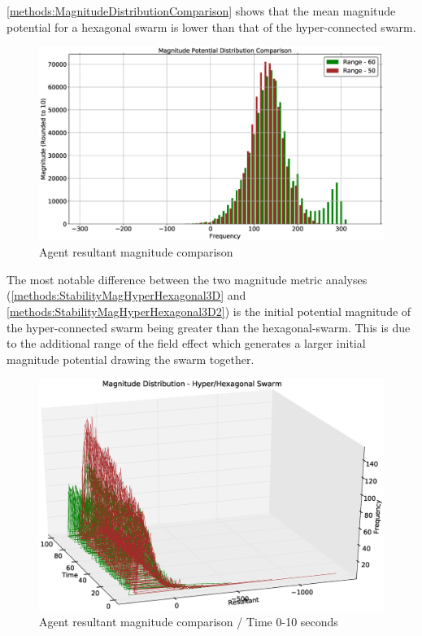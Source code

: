 \autoref{methods:MagnitudeDistributionComparison} shows that the mean magnitude potential for a hexagonal swarm is lower than that of the hyper-connected swarm.
\begin{figure}[H]
\begin{center}
\includegraphics[width=13cm]{CHAPTER-5/figures/MagnitudeDistributionComparison}
\end{center}
\caption{Agent resultant magnitude comparison\label{methods:MagnitudeDistributionComparison}}
\end{figure}

The most notable difference between the two magnitude metric analyses (\autoref{methods:StabilityMagHyperHexagonal3D} and \ref{methods:StabilityMagHyperHexagonal3D2}) is the initial potential magnitude of the hyper-connected swarm being greater than the hexagonal-swarm. This is due to the additional range of the field effect which generates a larger initial magnitude potential drawing the swarm together.
\begin{figure}[H]
\begin{center}
\includegraphics[width=13cm]{CHAPTER-5/figures/StabilityMagHyperHexagonal3D}
\end{center}
\caption{Agent resultant magnitude comparison / Time 0-10 seconds\label{methods:StabilityMagHyperHexagonal3D}}
\end{figure}

